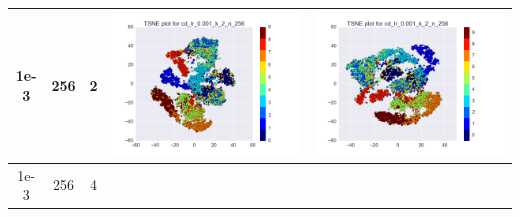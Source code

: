 \documentclass[12pt]{report}
\begin{document}
\begin{table}[H]
\begin{tabular}{ | c | c | c | c || c |}
    1e-3 & 256 & 2 &
    \begin{minipage}{.3\textwidth}
      \includegraphics[scale=0.25]{cd_lr_0_001_k_2_n_256.png}
    \end{minipage} &
    \begin{minipage}{.3\textwidth}
      \includegraphics[scale=0.25]{test_cd_lr_0_001_k_2_n_256.png}
    \end{minipage}
    \\ \hline
    1e-3 & 256 & 4 &
    \begin{minipage}{.3\textwidth}

\end{minipage}
\end{tabular}
\end{table}
\end{document}
